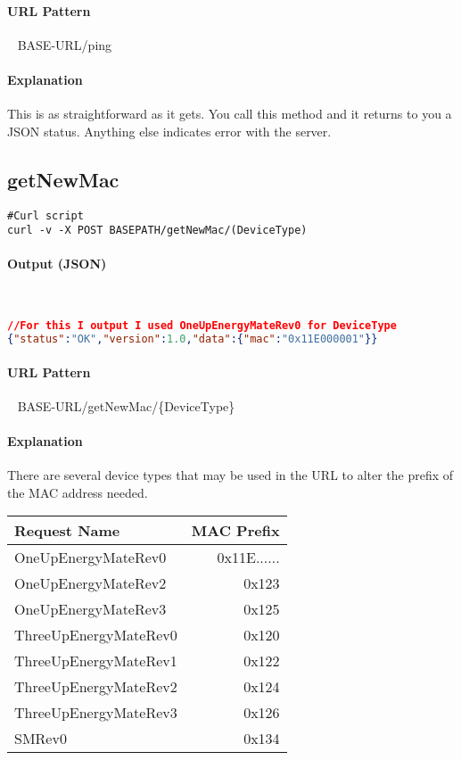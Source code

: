 \documentclass[
10pt, %
letterpaper, %
oneside, %
headinclude,footinclude, %
BCOR5mm, %
]{scrartcl}
\begin{document}
\paragraph{URL Pattern} 
~\newline
BASE-URL/ping

\paragraph{Explanation}
This is as straightforward as it gets. You call this method and it returns to you a JSON status. Anything else indicates error with the server.


\subsection{getNewMac}
\begin{lstlisting}
#Curl script 
curl -v -X POST BASEPATH/getNewMac/(DeviceType)
\end{lstlisting}

\paragraph{Output (JSON)}~
\begin{lstlisting}[language=json]
//For this I output I used OneUpEnergyMateRev0 for DeviceType
{"status":"OK","version":1.0,"data":{"mac":"0x11E000001"}}
\end{lstlisting}

\paragraph{URL Pattern} 
~\newline
BASE-URL/getNewMac/\{DeviceType\}

\paragraph{Explanation}
There are several device types that may be used in the URL to alter the prefix of the MAC address needed.
~\newline
\begin{tabular}{| l | r |}
\hline
\textbf{Request Name} & \textbf{MAC Prefix} \\
\hline
OneUpEnergyMateRev0 & 0x11E...... \\
OneUpEnergyMateRev2 & 0x123 \\
OneUpEnergyMateRev3 & 0x125 \\
ThreeUpEnergyMateRev0 & 0x120 \\
ThreeUpEnergyMateRev1 & 0x122 \\
ThreeUpEnergyMateRev2 & 0x124 \\
ThreeUpEnergyMateRev3 & 0x126 \\
SMRev0 & 0x134 \\
\hline
\end{tabular}
\end{document}
